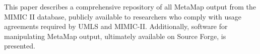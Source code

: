This paper describes a comprehensive repository of all MetaMap output from the MIMIC II database, publicly available to researchers who comply with usage agreements required by UMLS and MIMIC-II. Additionally, software for manipulating MetaMap output, ultimately available on Source Forge, is presented.
